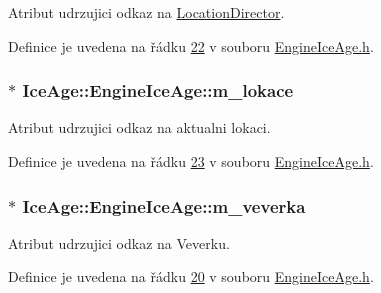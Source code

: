 Atribut udrzujici odkaz na \hyperlink{classIceAge_1_1LocationDirector}{Location\+Director}. 



Definice je uvedena na řádku \hyperlink{EngineIceAge_8h_source_l00022}{22} v souboru \hyperlink{EngineIceAge_8h_source}{Engine\+Ice\+Age.\+h}.

\subsubsection[{\texorpdfstring{m\+\_\+lokace}{m_lokace}}]{$\ast$ Ice\+Age\+::\+Engine\+Ice\+Age\+::m\+\_\+lokace\hspace{0.3cm}{\ttfamily [private]}}\hypertarget{classIceAge_1_1EngineIceAge_a04557f4c59d36d80e16b753cb918ea95}{}\label{classIceAge_1_1EngineIceAge_a04557f4c59d36d80e16b753cb918ea95}


Atribut udrzujici odkaz na aktualni lokaci. 



Definice je uvedena na řádku \hyperlink{EngineIceAge_8h_source_l00023}{23} v souboru \hyperlink{EngineIceAge_8h_source}{Engine\+Ice\+Age.\+h}.

\subsubsection[{\texorpdfstring{m\+\_\+veverka}{m_veverka}}]{$\ast$ Ice\+Age\+::\+Engine\+Ice\+Age\+::m\+\_\+veverka\hspace{0.3cm}{\ttfamily [private]}}\hypertarget{classIceAge_1_1EngineIceAge_ad9440d38fc579c99a87e7fda88b3bdcd}{}\label{classIceAge_1_1EngineIceAge_ad9440d38fc579c99a87e7fda88b3bdcd}


Atribut udrzujici odkaz na Veverku. 



Definice je uvedena na řádku \hyperlink{EngineIceAge_8h_source_l00020}{20} v souboru \hyperlink{EngineIceAge_8h_source}{Engine\+Ice\+Age.\+h}.


